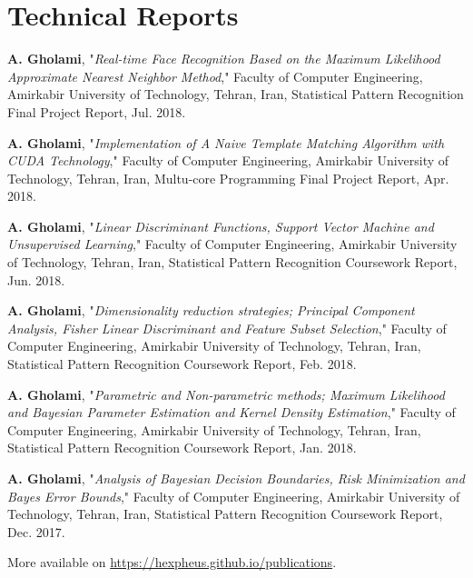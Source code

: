 \section{\sc Technical Reports}
	\textbf{A. Gholami}, "\textit{Real-time Face Recognition Based on the Maximum Likelihood Approximate Nearest Neighbor Method}," Faculty of Computer Engineering, Amirkabir University of Technology, Tehran, Iran, Statistical Pattern Recognition Final Project Report, Jul. 2018.
	
	\textbf{A. Gholami}, "\textit{Implementation of A Naive Template Matching Algorithm with CUDA Technology}," Faculty of Computer Engineering, Amirkabir University of Technology, Tehran, Iran, Multu-core Programming Final Project Report, Apr. 2018.
	
	\textbf{A. Gholami}, "\textit{Linear Discriminant Functions, Support Vector
		Machine and Unsupervised Learning}," Faculty of Computer Engineering, Amirkabir University of Technology, Tehran, Iran, Statistical Pattern Recognition Coursework Report, Jun. 2018.
	
	\textbf{A. Gholami}, "\textit{Dimensionality reduction strategies; Principal
		Component Analysis, Fisher Linear Discriminant and Feature Subset
		Selection}," Faculty of Computer Engineering, Amirkabir University of Technology, Tehran, Iran, Statistical Pattern Recognition Coursework Report, Feb. 2018.
	
	\textbf{A. Gholami}, "\textit{Parametric and Non-parametric methods; Maximum Likelihood and 
		Bayesian Parameter Estimation and Kernel Density Estimation}," Faculty of Computer Engineering, Amirkabir University of Technology, Tehran, Iran, Statistical Pattern Recognition Coursework Report, Jan. 2018.
	
	\textbf{A. Gholami}, "\textit{Analysis of Bayesian Decision Boundaries, Risk
		Minimization and Bayes Error Bounds}," Faculty of Computer Engineering, Amirkabir University of Technology, Tehran, Iran, Statistical Pattern Recognition Coursework Report, Dec. 2017.
	
More available on \url{https://hexpheus.github.io/publications}.
	
\endinput